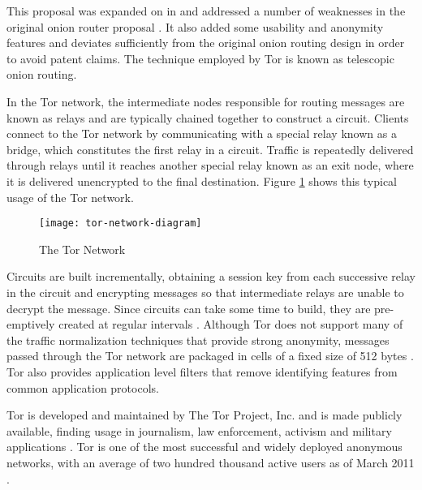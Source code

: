 \documentclass{ecuthesis}
\begin{document}
This proposal was expanded on in  and addressed a
number of weaknesses in the original onion router proposal
\parencite{Dingledine:2004p314}. It also added some usability and anonymity
features and deviates sufficiently from the original onion routing design in
order to avoid patent claims. The technique employed by Tor is known as
telescopic onion routing.

In the Tor network, the intermediate nodes responsible for routing messages are
known as relays and are typically chained together to construct a circuit.
Clients connect to the Tor network by communicating with a special relay known
as a bridge, which constitutes the first relay in a circuit. Traffic is
repeatedly delivered through relays until it reaches another special relay known
as an exit node, where it is delivered unencrypted to the final destination.
Figure \ref{tor-network} shows this typical usage of the Tor network.

\begin{figure}[H]
  \centering\texttt{[image: tor-network-diagram]}
  \caption{The Tor Network}
  \label{tor-network}
\end{figure}

Circuits are built incrementally, obtaining a session key from each
successive relay in the circuit and encrypting messages so that intermediate
relays are unable to decrypt the message. Since circuits can take some time to
build, they are pre-emptively created at regular intervals
\parencite[5]{Dingledine:2004p314}. Although Tor does not support many of the
traffic normalization techniques that provide strong anonymity, messages passed
through the Tor network are packaged in cells of a fixed size of 512 bytes
\parencite[5]{Dingledine:2004p314}. Tor also provides application level filters
that remove identifying features from common application protocols.

Tor is developed and maintained  by The Tor Project, Inc. and is made publicly
available, finding usage in journalism, law enforcement, activism and military
applications \parencite{The-Tor-Project-Inc.:2011uq}. Tor is one of the most
successful and widely deployed anonymous networks, with an average of two
hundred thousand active users as of March 2011
\parencite{The-Tor-Project-Inc.:2011fk}.

\end{document}
